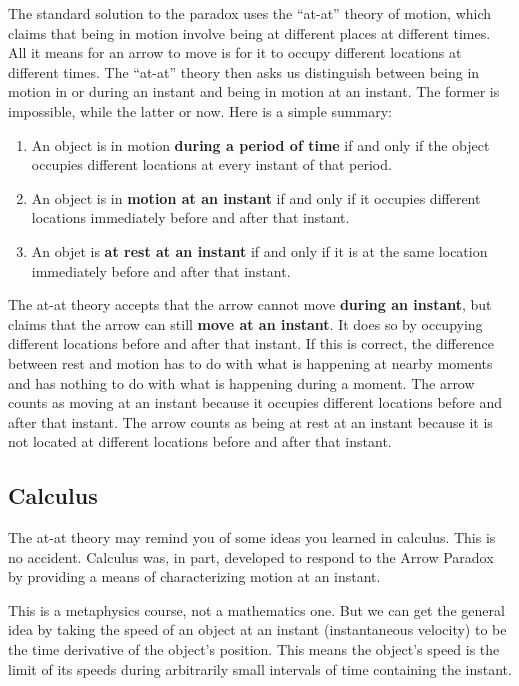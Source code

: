 \documentclass[oneside]{article}
\begin{document}
The standard solution to the paradox uses the ``at-at'' theory of
motion, which claims that being in motion involve being at different places at different times. All it means for an arrow to move is for it to occupy different locations at different times. The ``at-at'' theory then asks us distinguish between being in motion in or during an instant and   being in motion at an instant. The former is impossible, while the latter or now. Here is a simple summary: 
\begin{enumerate}
\item An object is in motion \textbf{during a period of time} if and only if the object occupies different locations at every instant of that period.
\item An object is in \textbf{motion at an instant} if and only if it occupies different locations immediately before and after that instant. 
\item An objet is \textbf{at rest at an instant} if and only if it is at the same location immediately before and after that instant. 
\end{enumerate}

The at-at theory accepts that the arrow cannot move \textbf{during an instant}, but claims that the arrow can still \textbf{move at an instant}. It does so by occupying different locations before and after that instant. If this is correct, the difference between rest and motion has to do with what is happening at nearby moments and has nothing to do with what is happening during a moment. The arrow counts as moving at an instant because it occupies different locations before and after that instant. The arrow counts as being at rest at an instant because it is not located at different locations before and after that instant.

\subsection{Calculus}

The at-at theory may remind you of some ideas you learned in calculus. This is no accident. Calculus was, in part, developed to respond to the Arrow Paradox by providing a means of characterizing motion at an instant. 

This is a metaphysics course, not a mathematics one. But we can get the general idea by taking the speed of an object at an instant (instantaneous velocity) to be the time derivative of the object's position. This means the object's speed is the limit of its speeds during arbitrarily small intervals of time containing the instant. 
\end{document}
